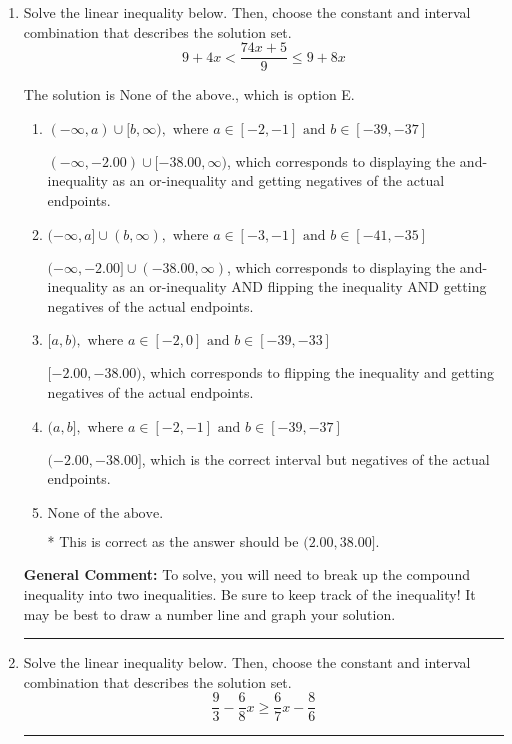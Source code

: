 \documentclass{extbook}[14pt]
\newcommand{\litem}[1]{\item #1

\rule{\textwidth}{0.4pt}}
\begin{document}
\begin{enumerate}
{\begin{enumerate}[label=\Alph*.]
You may have chosen this if you thought the inequality did not match the ends of the intervals.
\end{enumerate}

\textbf{General Comment:} Remember that less/greater than or equal to includes the endpoint, while less/greater do not. Also, remember that you need to flip the inequality when you multiply or divide by a negative.
}
\litem{
Solve the linear inequality below. Then, choose the constant and interval combination that describes the solution set.
\[ 9 + 4 x < \frac{74 x + 5}{9} \leq 9 + 8 x \]

The solution is \( \text{None of the above.} \), which is option E.\begin{enumerate}[label=\Alph*.]
\item \( (-\infty, a) \cup [b, \infty), \text{ where } a \in [-2, -1] \text{ and } b \in [-39, -37] \)

$(-\infty, -2.00) \cup [-38.00, \infty)$, which corresponds to displaying the and-inequality as an or-inequality and getting negatives of the actual endpoints.
\item \( (-\infty, a] \cup (b, \infty), \text{ where } a \in [-3, -1] \text{ and } b \in [-41, -35] \)

$(-\infty, -2.00] \cup (-38.00, \infty)$, which corresponds to displaying the and-inequality as an or-inequality AND flipping the inequality AND getting negatives of the actual endpoints.
\item \( [a, b), \text{ where } a \in [-2, 0] \text{ and } b \in [-39, -33] \)

$[-2.00, -38.00)$, which corresponds to flipping the inequality and getting negatives of the actual endpoints.
\item \( (a, b], \text{ where } a \in [-2, -1] \text{ and } b \in [-39, -37] \)

$(-2.00, -38.00]$, which is the correct interval but negatives of the actual endpoints.
\item \( \text{None of the above.} \)

* This is correct as the answer should be $(2.00, 38.00]$.
\end{enumerate}

\textbf{General Comment:} To solve, you will need to break up the compound inequality into two inequalities. Be sure to keep track of the inequality! It may be best to draw a number line and graph your solution.
}
\litem{
Solve the linear inequality below. Then, choose the constant and interval combination that describes the solution set.
\[ \frac{9}{3} - \frac{6}{8} x \geq \frac{6}{7} x - \frac{8}{6} \]

}
\end{enumerate}
\end{document}
